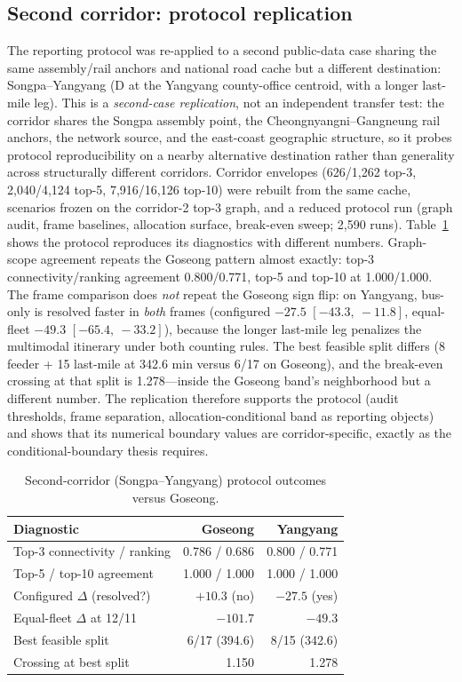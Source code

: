 \documentclass{ieeeaccess}
\begin{document}
\subsection{Second corridor: protocol replication}
The reporting protocol was re-applied to a second public-data case sharing the same assembly/rail anchors and national road cache but a different destination: Songpa--Yangyang (D at the Yangyang county-office centroid, with a longer last-mile leg). This is a \emph{second-case replication}, not an independent transfer test: the corridor shares the Songpa assembly point, the Cheongnyangni--Gangneung rail anchors, the network source, and the east-coast geographic structure, so it probes protocol reproducibility on a nearby alternative destination rather than generality across structurally different corridors. Corridor envelopes (626/1{,}262 top-3, 2{,}040/4{,}124 top-5, 7{,}916/16{,}126 top-10) were rebuilt from the same cache, scenarios frozen on the corridor-2 top-3 graph, and a reduced protocol run (graph audit, frame baselines, allocation surface, break-even sweep; 2{,}590 runs). Table~\ref{tab:corridor2} shows the protocol reproduces its diagnostics with different numbers. Graph-scope agreement repeats the Goseong pattern almost exactly: top-3 connectivity/ranking agreement 0.800/0.771, top-5 and top-10 at 1.000/1.000. The frame comparison does \emph{not} repeat the Goseong sign flip: on Yangyang, bus-only is resolved faster in \emph{both} frames (configured $-27.5$ $[-43.3,\ -11.8]$, equal-fleet $-49.3$ $[-65.4,\ -33.2]$), because the longer last-mile leg penalizes the multimodal itinerary under both counting rules. The best feasible split differs (8 feeder + 15 last-mile at 342.6 min versus 6/17 on Goseong), and the break-even crossing at that split is 1.278---inside the Goseong band's neighborhood but a different number. The replication therefore supports the protocol (audit thresholds, frame separation, allocation-conditional band as reporting objects) and shows that its numerical boundary values are corridor-specific, exactly as the conditional-boundary thesis requires.

\begin{table}[!t]
\caption{Second-corridor (Songpa--Yangyang) protocol outcomes versus Goseong.}
\label{tab:corridor2}
\centering
\footnotesize
\begin{tabular}{@{}lrr@{}}
\hline
Diagnostic & Goseong & Yangyang \\
\hline
Top-3 connectivity / ranking & 0.786 / 0.686 & 0.800 / 0.771 \\
Top-5 / top-10 agreement & 1.000 / 1.000 & 1.000 / 1.000 \\
Configured $\Delta$ (resolved?) & $+10.3$ (no) & $-27.5$ (yes) \\
Equal-fleet $\Delta$ at 12/11 & $-101.7$ & $-49.3$ \\
Best feasible split & 6/17 (394.6) & 8/15 (342.6) \\
Crossing at best split & 1.150 & 1.278 \\
\hline
\end{tabular}
\end{table}
\end{document}
